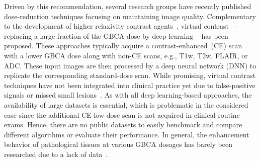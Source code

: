\documentclass[a4paper,10pt]{article}
\begin{document}
Driven by this recommendation, several research groups have recently published dose-reduction techniques focusing on maintaining image quality.
Complementary to the development of higher relaxivity contrast agents~\cite{RoPo19}, virtual contrast~\cite{GoPa18,AmBo22} -- replacing a large fraction of the GBCA dose by deep learning -- has been proposed. %
These approaches typically acquire a contrast-enhanced~(CE) scan with a lower GBCA dose along with non-CE scans, e.g., T1w, T2w, FLAIR, or ADC.
These input images are then processed by a deep neural network (DNN) to replicate the corresponding standard-dose scan.
While promising, virtual contrast techniques have not been integrated into clinical practice yet due to false-positive signals or missed small lesions~\cite{LuZh21,AmBo22}.
As with all deep learning-based approaches, the availability of large datasets is essential, which is problematic in the considered case since the additional CE low-dose scan is not acquired in clinical routine exams.
Hence, there are no public datasets to easily benchmark and compare different algorithms or evaluate their performance.
In general, the enhancement behavior of pathological tissues at various GBCA dosages has barely been researched due to a lack of data~\cite{HaPi23b}.
\end{document}
